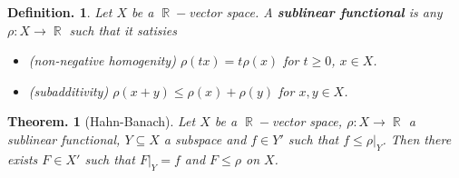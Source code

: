 \documentclass[11pt, a4paper]{memoir}
\DeclareMathOperator{\R}{{\mathbb{R}}}
\theoremstyle{change}
\newtheorem{theorem}{Theorem.}[section]
\theoremstyle{plain}
\theoremstyle{nonumberplain}
\newtheorem{definition}{Definition.}
\numberwithin{equation}{section}
\begin{document}
\begin{definition}
    Let $X$ be a $\R-$vector space.
    A \textbf{sublinear functional} is any $\rho:X\to\R$ such that it satisies
    \begin{itemize}[nl]
        \item \textit{(non-negative homogenity)} $\rho(tx)=t\rho(x)$ for $t\geq 0$, $x\in X$.
        \item \textit{(subadditivity)} $\rho(x+y)\leq\rho(x)+\rho(y)$ for $x,y\in X$.
    \end{itemize}
\end{definition}

\begin{theorem}[Hahn-Banach]
    Let $X$ be a $\R-$vector space, $\rho:X\to\R$ a sublinear functional, $Y\subseteq X$ a subspace and $f\in Y'$ such that $f\leq\rho|_Y$.
    Then there exists $F\in X'$ such that $F|_Y=f$ and $F\leq\rho$ on $X$.
\end{theorem}
\end{document}
